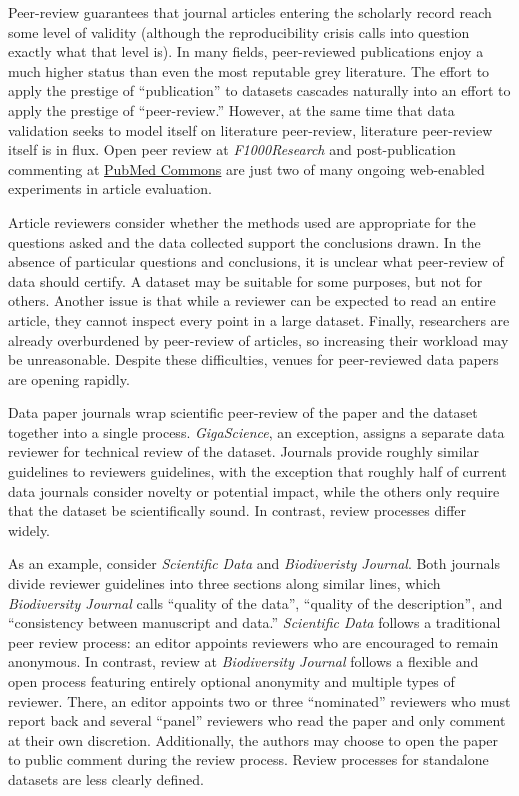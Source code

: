 \documentclass[10pt,twocolumn]{article}
\begin{document}
Peer-review guarantees that journal articles entering the scholarly record reach some level of validity (although the reproducibility crisis calls into question exactly what that level is).
In many fields, peer-reviewed publications enjoy a much higher status than even the most reputable grey literature.
The effort to apply the prestige of ``publication'' to datasets cascades naturally into an effort to apply the prestige of ``peer-review.''
However, at the same time that data validation seeks to model itself on literature peer-review, literature peer-review itself is in flux. %
Open peer review at \emph{F1000Research} and post-publication commenting at \href{http://www.ncbi.nlm.nih.gov/pubmedcommons/}{PubMed Commons} are just two of many ongoing web-enabled experiments in article evaluation.

Article reviewers consider whether the methods used are appropriate for the questions asked and the data collected support the conclusions drawn.
In the absence of particular questions and conclusions, it is unclear what peer-review of data should certify.
A dataset may be suitable for some purposes, but not for others.\cite{parsons_data_2010}
Another issue is that while a reviewer can be expected to read an entire article, they cannot inspect every point in a large dataset.
Finally, researchers are already overburdened by peer-review of articles, so increasing their workload may be unreasonable.
Despite these difficulties, venues for peer-reviewed data papers are opening rapidly.

Data paper journals wrap scientific peer-review of the paper and the dataset together into a single process.
\emph{GigaScience}, an exception, assigns a separate data reviewer for technical review of the dataset.
Journals provide roughly similar guidelines to reviewers guidelines, with the exception that roughly half of current data journals consider novelty or potential impact, while the others only require that the dataset be scientifically sound.
In contrast, review processes differ widely.

As an example, consider \emph{Scientific Data} and \emph{Biodiveristy Journal}.
Both journals divide reviewer guidelines into three sections along similar lines, which \emph{Biodiversity Journal} calls ``quality of the data'', ``quality of the description'', and ``consistency between manuscript and data.''
\emph{Scientific Data} follows a traditional peer review process: an editor appoints reviewers who are encouraged to remain anonymous.
In contrast, review at \emph{Biodiversity Journal} follows a flexible and open process featuring entirely optional anonymity and multiple types of reviewer.
There, an editor appoints two or three ``nominated'' reviewers who must report back and several ``panel'' reviewers who read the paper and only comment at their own discretion.
Additionally, the authors may choose to open the paper to public comment during the review process.
Review processes for standalone datasets are less clearly defined.
\end{document}
